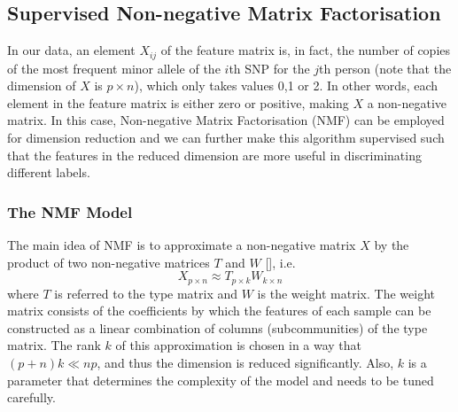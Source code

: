 \documentclass[a4paper,12pt]{article}
\begin{document}
\subsection{Supervised Non-negative Matrix Factorisation}
In our data, an element $X_{ij}$ of the feature matrix is, in fact, the number of copies of the most frequent minor allele of the $i$th SNP for the $j$th person (note that the dimension of $X$ is $p \times n$), which only takes values 0,1 or 2. In other words, each element in the feature matrix is either zero or positive, making $X$ a non-negative matrix. In this case, Non-negative Matrix Factorisation (NMF) can be employed for dimension reduction and we can further make this algorithm supervised such that the features in the reduced dimension are more useful in discriminating different labels.

\subsubsection{The NMF Model}
The main idea of NMF is to approximate a non-negative matrix $X$ by the product of two non-negative matrices $T$ and $W$ [\cite{lee1999learning}], i.e.
\begin{equation*}
X_{p \times n} \approx T_{p \times k} W_{k \times n}
\end{equation*}
where $T$ is referred to the type matrix and $W$ is the weight matrix. The weight matrix consists of the coefficients by which the features of each sample can be constructed as a linear combination of columns (subcommunities) of the type matrix. The rank $k$ of this approximation is chosen in a way that $(p+n)k \ll n p$, and thus the dimension is reduced significantly. Also, $k$ is a parameter that determines the complexity of the model and needs to be tuned carefully. 
\end{document}
